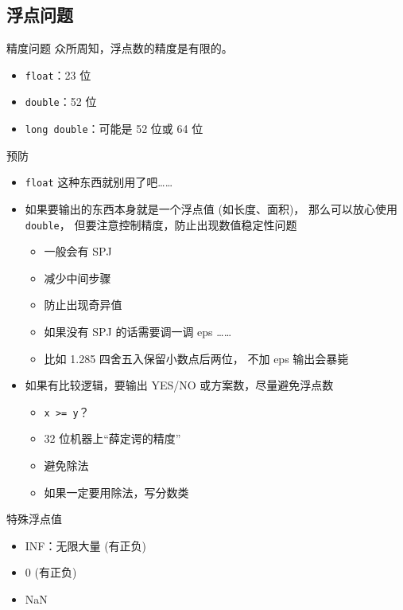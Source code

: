 \documentclass[10pt,mathserif]{beamer}
\begin{document}
\subsection{浮点问题}
\begin{frame}{精度问题}
	众所周知，浮点数的精度是有限的。
	\begin{itemize}
		\item \lstinline!float!：23 位
		\item \lstinline!double!：52 位
		\item \lstinline!long double!：可能是 52 位或 64 位
	\end{itemize}
\end{frame}

\begin{frame}{预防}
	\begin{itemize}
		\item \lstinline!float! 这种东西就别用了吧……
		\item 如果要输出的东西本身就是一个浮点值 (如长度、面积)，
			那么可以放心使用 \lstinline!double!，
			但要注意控制精度，防止出现数值稳定性问题
			\begin{itemize}
				\item 一般会有 SPJ
				\item 减少中间步骤
				\item 防止出现奇异值
				\item 如果没有 SPJ 的话需要调一调 eps ……
				\item 比如 1.285 四舍五入保留小数点后两位，
					不加 eps 输出会暴毙
			\end{itemize}
		\item 如果有比较逻辑，要输出 YES/NO 或方案数，尽量避免浮点数
			\begin{itemize}
				\item \lstinline|x >= y|？
				\item 32 位机器上“薛定谔的精度”
				\item 避免除法
				\item 如果一定要用除法，写分数类
			\end{itemize}
	\end{itemize}
\end{frame}

\begin{frame}{特殊浮点值}
	\begin{itemize}
		\item INF：无限大量 (有正负)
		\item 0 (有正负)
		\item NaN
	\end{itemize}
\end{frame}
\end{document}
